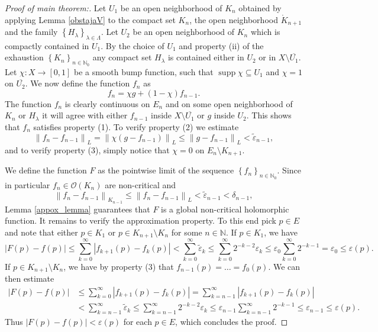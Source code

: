 \documentclass[a4paper,11pt]{amsart}
\newcommand{\N}{\mathbb N}
\newcommand{\set}[1]{\left\{#1\right\}}
\newcommand{\abs}[1]{\left|#1\right|}
\newcommand{\norm}[1]{\left\lVert#1\right\rVert}
\DeclareMathOperator{\supp}{supp}
\begin{document}
\begin{proof}[Proof of main theorem:]
    Let $U_1$ be an open neighborhood of $K_n$ obtained by applying Lemma \ref{obstajaV} to the compact set $K_n$, the open neighborhood $\mathring{K}_{n+1}$ and the family $\set{H_\lambda}_{\lambda \in \Lambda}$.
    Let $U_2$ be an open neighborhood of $K_n$ which is compactly contained in $U_1$.
    By the choice of $U_1$ and property (ii) of the exhaustion $\set{K_n}_{n \in \N_0}$
    any compact set $H_\lambda$ is contained either in $U_2$ or in $X \setminus \overline{U_1}$. 
    Let $\chi \colon X \to [0,1]$ be a smooth bump function, such that $\supp \chi \subseteq U_1$ and $\chi = 1$ on $\overline{U_2}$.
    We now define the function $f_n$ as
    \[f_n = \chi g + (1-\chi) f_{n-1}.\]
    The function $f_n$ is clearly continuous on $E_n$ and on some open neighborhood of $K_n$ or $H_\lambda$ it will agree with either $f_{n-1}$ inside $X \setminus \overline{U_1}$ or $g$ inside $U_2$.
    This shows that $f_n$ satisfies property (1).
    To verify property (2) we estimate 
    \[\norm{f_n-f_{n-1}}_{L} = \norm{\chi(g-f_{n-1})}_{L} \le \norm{g-f_{n-1}}_{L} < \tilde{\varepsilon}_{n-1},\]
    and to verify property (3), simply notice that $\chi = 0$ on $E_n \setminus K_{n+1}$. 

    We define the function $F$ as the pointwise limit of the sequence $\set{f_n}_{n \in \N_0}$.
    Since in particular $f_n \in \mathcal{O}(K_n)$ are non-critical and 
    \[\norm{f_n - f_{n-1}}_{K_{n-1}} \le \norm{f_n - f_{n-1}}_{L} < \tilde{\varepsilon}_{n-1} < \delta_{n-1},\]
    Lemma \ref{appox_lemma} guarantees that $F$ is a global non-critical holomorphic function. 
    It remains to verify the approximation property. To this end pick $p \in E$ and note that either $p \in K_1$ or $p \in K_{n+1}\setminus K_n$ for some $n \in \N$.
    If $p \in K_1$, we have 
    \[\abs{F(p)-f(p)} \le \sum_{k=0}^\infty \abs{f_{k+1}(p)- f_k(p)} < \sum_{k=0}^\infty \tilde{\varepsilon}_k \le \sum_{k=0}^\infty 2^{-k-2}\varepsilon_k \le \varepsilon_0 \sum_{k=0}^\infty 2^{-k-1} = \varepsilon_0 \le \varepsilon(p).\]
    If $p \in K_{n+1} \setminus K_n$, we have by property (3) that $f_{n-1}(p) = \ldots = f_0(p)$. We can then estimate 
    \begin{align*}
    \abs{F(p)-f(p)} &\le \sum_{k=0}^\infty \abs{f_{k+1}(p)- f_k(p)} = \sum_{k=n-1}^\infty \abs{f_{k+1}(p)- f_k(p)} \\
    &< \sum_{k=n-1}^\infty \tilde{\varepsilon}_k \le \sum_{k=n-1}^\infty 2^{-k-2}\varepsilon_k \le \varepsilon_{n-1} \sum_{k=n-1}^\infty 2^{-k-1} \le \varepsilon_{n-1} \le \varepsilon(p).
    \end{align*}
    Thus $\abs{F(p)-f(p)} < \varepsilon(p)$ for each $p \in E$, which concludes the proof.
\end{proof}
\end{document}
